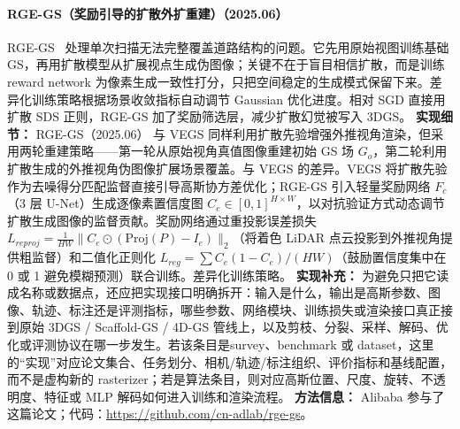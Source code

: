 \paragraph{RGE-GS（奖励引导的扩散外扩重建）（2025.06）}

RGE-GS~\cite{2506_22800} 处理单次扫描无法完整覆盖道路结构的问题。它先用原始视图训练基础 GS，再用扩散模型从扩展视点生成伪图像；关键不在于盲目相信扩散，而是训练 reward network 为像素生成一致性打分，只把空间稳定的生成模式保留下来。差异化训练策略根据场景收敛指标自动调节 Gaussian 优化进度。相对 SGD 直接用扩散 SDS 正则，RGE-GS 加了奖励筛选层，减少扩散幻觉被写入 3DGS。
\textbf{实现细节：} RGE-GS（2025.06） 与 VEGS 同样利用扩散先验增强外推视角渲染，但采用两轮重建策略——第一轮从原始视角真值图像重建初始 GS 场 $G_o$，第二轮利用扩散生成的外推视角伪图像扩展场景覆盖。与 VEGS 的差异。VEGS 将扩散先验作为去噪得分匹配监督直接引导高斯协方差优化；RGE-GS 引入轻量奖励网络 $F_c$（3 层 U-Net）生成逐像素置信度图 $C_e \in [0,1]^{H \times W}$，以对抗验证方式动态调节扩散生成图像的监督贡献。奖励网络通过重投影误差损失 $L_{reproj} = \frac{1}{HW}\|C_e \odot (\mathrm{Proj}(P) - I_e)\|_2$（将着色 LiDAR 点云投影到外推视角提供粗监督）和二值化正则化 $L_{reg} = \sum C_e(1-C_e)/(HW)$（鼓励置信度集中在 0 或 1 避免模糊预测）联合训练。差异化训练策略。
\textbf{实现补充：} 为避免只把它读成名称或数据点，还应把实现接口明确拆开：输入是什么，输出是高斯参数、图像、轨迹、标注还是评测指标，哪些参数、网络模块、训练损失或渲染接口真正接到原始 3DGS / Scaffold-GS / 4D-GS 管线上，以及剪枝、分裂、采样、解码、优化或评测协议在哪一步发生。若该条目是survey、benchmark 或 dataset，这里的“实现”对应论文集合、任务划分、相机/轨迹/标注组织、评价指标和基线配置，而不是虚构新的 rasterizer；若是算法条目，则对应高斯位置、尺度、旋转、不透明度、特征或 MLP 解码如何进入训练和渲染流程。
\textbf{方法信息：} Alibaba 参与了这篇论文；代码：\url{https://github.com/cn-adlab/rge-gs}。



